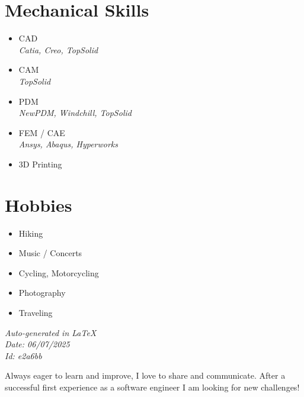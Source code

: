 \documentclass[]{friggeri-cv}
\begin{document}
\begin{aside}
\section{Mechanical Skills}
\begin{itemize}
\item CAD
 \\ \hspace*{0.2em}\small\textit{Catia, Creo, TopSolid}
\item CAM
 \\ \hspace*{0.2em}\small\textit{TopSolid}
\item PDM
 \\ \hspace*{0.2em}\small\textit{NewPDM, Windchill, TopSolid}
\item FEM / CAE
 \\ \hspace*{0.2em}\small\textit{Ansys, Abaqus, Hyperworks}
\item 3D Printing
\end{itemize}
\section{Hobbies}
\begin{itemize}
\item Hiking
\item Music / Concerts
\item Cycling, Motorcycling
\item Photography
\item Traveling
\end{itemize}
\vspace{2.5mm}%
\small \emph{Auto-generated in \LaTeX}\\
\small \emph{Date: 06/07/2025} \hspace*{8mm}\\
\small \emph{Id: e2a6bb} %

\end{aside}

\vspace*{-2.0mm}
\noindent\parbox{\linewidth}{
  \centering
  Always eager to learn and improve, I love to share and communicate. After a successful first experience as a software engineer I am looking for new challenges!
}
\vspace*{0.8mm}
\end{document}
